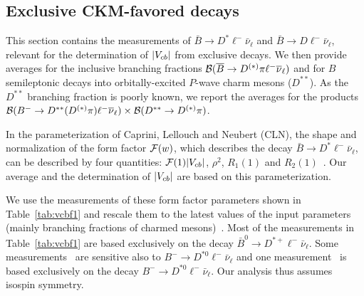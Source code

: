 \subsection{Exclusive CKM-favored decays}
\label{slbdecays_b2cexcl}
This section contains the measurements of $\bar B\to
D^*\ell^-\bar\nu_\ell$ and $\bar B\to D\ell^-\bar\nu_\ell$, relevant
for the determination of $|V_{cb}|$ from exclusive decays. We then provide
averages for the inclusive branching fractions $\cbf(\bar B\to
D^{(*)}\pi \ell^-\bar\nu_\ell)$ and for $B$ semileptonic decays into
orbitally-excited $P$-wave charm mesons ($D^{**}$). As the $D^{**}$
branching fraction is poorly known, we report the averages for the products 
$\cbf(B^-\to D^{**}(D^{(*)}\pi)\ell^-\bar\nu_\ell)\times
\cbf(D^{**}\to D^{(*)}\pi)$.


\label{slbdecays_dstarlnu}

In the parameterization of Caprini, Lellouch and Neubert
(CLN), the shape and normalization of the form factor ${\cal F}(w)$, which describes
the decay $\bar B\to D^*\ell^-\bar\nu_\ell$, can be described by four
quantities: ${\cal F}(1)|V_{cb}|$, $\rho^2$, $R_1(1)$ and
$R_2(1)$~\cite{CLN}. Our average and the determination of $|V_{cb}|$ are
based on this parameterization.

We use the measurements of these form factor parameters shown in
Table~\ref{tab:vcbf1} and rescale them to the latest values of the
input parameters (mainly branching fractions of charmed
mesons)~\cite{HFAG_sl:inputparams}. Most of the measurements in
Table~\ref{tab:vcbf1} are based exclusively on the decay $\bar B^0\to
D^{*+}\ell^-\bar\nu_\ell$. Some
measurements~\cite{Adam:2002uw,Aubert:2009_1} are sensitive also to
$B^-\to D^{*0}\ell^-\bar\nu_\ell$ and one
measurement~\cite{Aubert:2009_3} is based exclusively on the decay
$B^-\to D^{*0}\ell^-\bar\nu_\ell$. Our analysis thus assumes isospin
symmetry.


